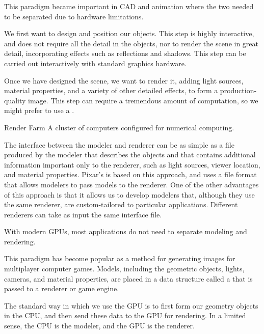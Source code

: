 \documentclass[\main/notes.tex]{subfiles}
\begin{document}
				This paradigm became important in CAD and animation where
				the two needed to be separated due to hardware limitations.

				\begin{example}
					We first want to design and position our objects.
					This step is highly interactive, and does not require all the detail in the objects,
					nor to render the scene in great detail,
					incorporating effects such as reflections and shadows.
					This step can be carried out interactively with standard graphics hardware.

					Once we have designed the scene, we want to render it,
					adding light sources, material properties, and a variety of other detailed effects,
					to form a production-quality image.
					This step can require a tremendous amount of computation,
					so we might prefer to use a .

					\begin{definition}{Render Farm}
						A cluster of computers configured for numerical computing.
					\end{definition}
				\end{example}

				The interface between the modeler and renderer can be
				as simple as a file produced by the modeler that describes the objects
				and that contains additional information important only to the renderer,
				such as light sources, viewer location, and material properties.
				Pixar's  is based on this approach,
				and uses a file format that allows modelers to pass models to the renderer.
				One of the other advantages of this approach is that
				it allows us to develop modelers that,
				although they use the same renderer,
				are custom-tailored to particular applications.
				Different renderers can take as input the same interface file.

				With modern GPUs, most applications do not need to separate modeling and rendering.

				This paradigm has become popular as a method
				for generating images for multiplayer computer games.
				Models, including the geometric objects, lights, cameras, and material properties,
				are placed in a data structure called a 
				that is passed to a renderer or game engine.

				The standard way in which we use the GPU is to
				first form our geometry objects in the CPU,
				and then send these data to the GPU for rendering.
				In a limited sense, the CPU is the modeler, and the GPU is the renderer.
\end{document}
